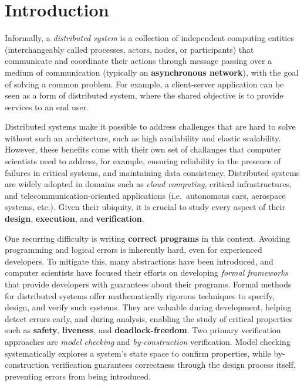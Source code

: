 \chapter{Introduction} \label{chap:intro}
\pagestyle{plain}
\setcounter{page}{1}

Informally, a \textit{distributed system} is a collection of independent 
computing entities (interchangeably called processes, actors, 
nodes, or participants) that communicate and coordinate their 
actions through message passing over a medium of communication 
(typically an \textbf{asynchronous network}), with the goal of solving a 
common problem. For example, a client-server application can be seen 
as a form of distributed system, where the shared objective is to provide 
services to an end user.

Distributed systems make it possible to address challenges that are
hard to solve without such an architecture, such as high availability
and elastic scalability. However, these benefits come with their own
set of challanges that computer scientists need to
address, for example, ensuring reliability in the presence of failures
in critical systems, and maintaining data consistency.
Distributed systems are 
widely adopted in domains such as \textit{cloud computing}, critical 
infrastructures, and telecommunication-oriented applications (i.e.\ 
autonomous cars, aerospace systems, etc.). Given their ubiquity, it is 
crucial to study every aspect of their \textbf{design}, \textbf{execution}, 
and \textbf{verification}.

One recurring difficulty is writing \textbf{correct programs} in this 
context. Avoiding programming and logical errors is inherently hard, even 
for experienced developers. To mitigate this, many abstractions have been 
introduced, and computer scientists have focused their efforts on developing 
\textit{formal frameworks} that provide developers with guarantees about 
their programs. Formal methods for distributed systems offer 
mathematically rigorous techniques to specify, design, and 
verify such systems. They are valuable during development, helping 
detect errors early, and during analysis, enabling the study of critical 
properties such as \textbf{safety}, \textbf{liveness}, and 
\textbf{deadlock-freedom}. Two primary verification approaches are 
\textit{model checking} and \textit{by-construction} verification. Model 
checking systematically explores a system's state space to confirm 
properties, while by-construction verification guarantees correctness 
through the design process itself, preventing errors from being introduced. 

